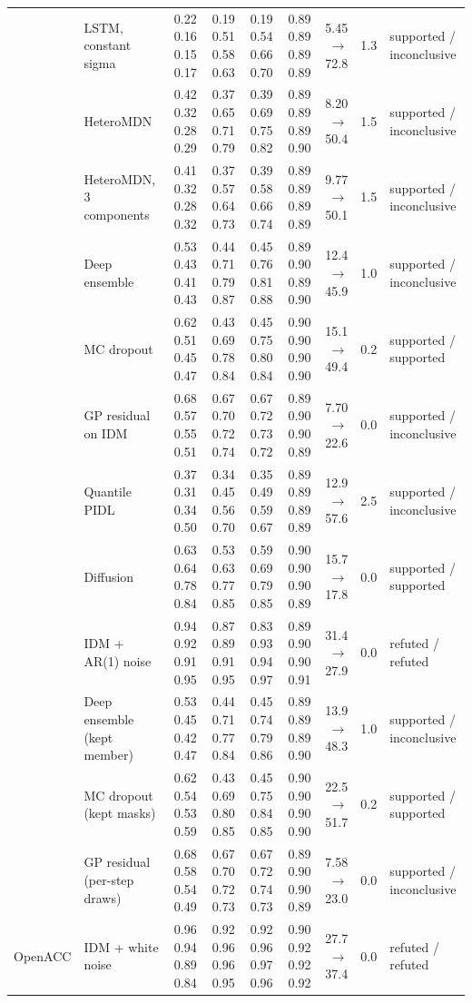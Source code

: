\begin{longtable}{llrrrrrrl}
 & LSTM, constant sigma & 0.22 0.16 0.15 0.17 & 0.19 0.51 0.58 0.63 & 0.19 0.54 0.66 0.70 & 0.89 0.89 0.89 0.89 & 5.45 $\rightarrow$ 72.8 & 1.3 & supported / inconclusive \\
 & HeteroMDN & 0.42 0.32 0.28 0.29 & 0.37 0.65 0.71 0.79 & 0.39 0.69 0.75 0.82 & 0.89 0.89 0.89 0.90 & 8.20 $\rightarrow$ 50.4 & 1.5 & supported / inconclusive \\
 & HeteroMDN, 3 components & 0.41 0.32 0.28 0.32 & 0.37 0.57 0.64 0.73 & 0.39 0.58 0.66 0.74 & 0.89 0.89 0.89 0.89 & 9.77 $\rightarrow$ 50.1 & 1.5 & supported / inconclusive \\
 & Deep ensemble & 0.53 0.43 0.41 0.43 & 0.44 0.71 0.79 0.87 & 0.45 0.76 0.81 0.88 & 0.89 0.90 0.89 0.90 & 12.4 $\rightarrow$ 45.9 & 1.0 & supported / inconclusive \\
 & MC dropout & 0.62 0.51 0.45 0.47 & 0.43 0.69 0.78 0.84 & 0.45 0.75 0.80 0.84 & 0.90 0.90 0.90 0.90 & 15.1 $\rightarrow$ 49.4 & 0.2 & supported / supported \\
 & GP residual on IDM & 0.68 0.57 0.55 0.51 & 0.67 0.70 0.72 0.74 & 0.67 0.72 0.73 0.72 & 0.89 0.90 0.90 0.89 & 7.70 $\rightarrow$ 22.6 & 0.0 & supported / inconclusive \\
 & Quantile PIDL & 0.37 0.31 0.34 0.50 & 0.34 0.45 0.56 0.70 & 0.35 0.49 0.59 0.67 & 0.89 0.89 0.89 0.89 & 12.9 $\rightarrow$ 57.6 & 2.5 & supported / inconclusive \\
 & Diffusion & 0.63 0.64 0.78 0.84 & 0.53 0.63 0.77 0.85 & 0.59 0.69 0.79 0.85 & 0.90 0.90 0.90 0.89 & 15.7 $\rightarrow$ 17.8 & 0.0 & supported / supported \\
 & IDM + AR(1) noise & 0.94 0.92 0.91 0.95 & 0.87 0.89 0.91 0.95 & 0.83 0.93 0.94 0.97 & 0.89 0.90 0.90 0.91 & 31.4 $\rightarrow$ 27.9 & 0.0 & refuted / refuted \\
 & Deep ensemble (kept member) & 0.53 0.45 0.42 0.47 & 0.44 0.71 0.77 0.84 & 0.45 0.74 0.79 0.86 & 0.89 0.89 0.89 0.90 & 13.9 $\rightarrow$ 48.3 & 1.0 & supported / inconclusive \\
 & MC dropout (kept masks) & 0.62 0.54 0.53 0.59 & 0.43 0.69 0.80 0.85 & 0.45 0.75 0.84 0.85 & 0.90 0.90 0.90 0.90 & 22.5 $\rightarrow$ 51.7 & 0.2 & supported / supported \\
 & GP residual (per-step draws) & 0.68 0.58 0.54 0.49 & 0.67 0.70 0.72 0.73 & 0.67 0.72 0.74 0.73 & 0.89 0.90 0.90 0.89 & 7.58 $\rightarrow$ 23.0 & 0.0 & supported / inconclusive \\
\midrule
OpenACC & IDM + white noise & 0.96 0.94 0.89 0.84 & 0.92 0.96 0.96 0.95 & 0.92 0.96 0.97 0.96 & 0.90 0.92 0.92 0.92 & 27.7 $\rightarrow$ 37.4 & 0.0 & refuted / refuted \\

\end{longtable}

